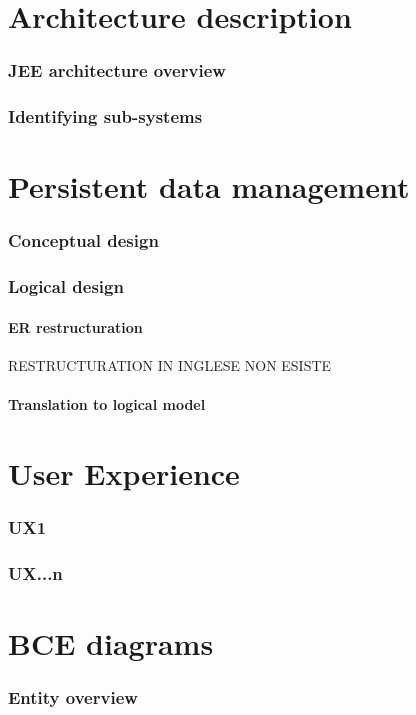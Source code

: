 \documentclass[10pt,a4paper,titlepage]{article}
\begin{document}


\part{Architecture description}
\section{JEE architecture overview}
\section{Identifying sub-systems}

\clearpage
\part{Persistent data management}
\section{Conceptual design}
\section{Logical design}
\subsection{ER restructuration}
RESTRUCTURATION IN INGLESE NON ESISTE
\subsection{Translation to logical model}

\clearpage
\part{User Experience}
\section{UX1}
\section{UX...n}

\clearpage
\part{BCE diagrams}
\section{Entity overview}
\end{document}
